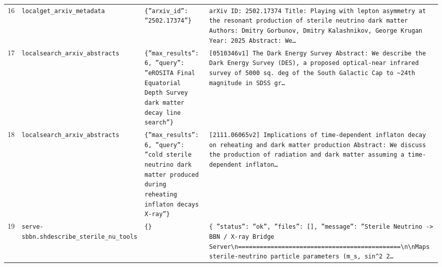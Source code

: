\documentclass[11pt,a4paper]{article}
\begin{document}
\begin{longtable}{@{}p{}p{}p{}p{}@{}}
16 & \texttt{local}\newline\texttt{get\_\allowbreak{}arxiv\_\allowbreak{}metadata} & \texttt{\{''arxiv\_\allowbreak{}id'':\allowbreak{} ''2502.17374''\}\allowbreak{}} & \texttt{arXiv ID:\allowbreak{} 2502.17374 Title:\allowbreak{} Playing with lepton asymmetry at the resonant production of sterile neutrino dark matter Authors:\allowbreak{} Dmitry Gorbunov,\allowbreak{} Dmitry Kalashnikov,\allowbreak{} George Krugan Year:\allowbreak{} 2025 Abstract:\allowbreak{} We\ldots{}\allowbreak{}} \\
17 & \texttt{local}\newline\texttt{search\_\allowbreak{}arxiv\_\allowbreak{}abstracts} & \texttt{\{''max\_\allowbreak{}results'':\allowbreak{} 6,\allowbreak{} ''query'':\allowbreak{} ''eROSITA Final Equatorial Depth Survey dark matter decay line search''\}\allowbreak{}} & \texttt{[0510346v1]\allowbreak{} The Dark Energy Survey Abstract:\allowbreak{}   We describe the Dark Energy Survey (DES)\allowbreak{},\allowbreak{} a proposed optical-near infrared survey of 5000 sq. deg of the South Galactic Cap to \textasciitilde{}\allowbreak{}24th magnitude in SDSS gr\ldots{}\allowbreak{}} \\
18 & \texttt{local}\newline\texttt{search\_\allowbreak{}arxiv\_\allowbreak{}abstracts} & \texttt{\{''max\_\allowbreak{}results'':\allowbreak{} 6,\allowbreak{} ''query'':\allowbreak{} ''cold sterile neutrino dark matter produced during reheating inflaton decays X-ray''\}\allowbreak{}} & \texttt{[2111.06065v2]\allowbreak{} Implications of time-dependent inflaton decay on reheating and dark matter production Abstract:\allowbreak{} We discuss the production of radiation and dark matter assuming a time-dependent inflaton\ldots{}\allowbreak{}} \\
19 & \texttt{serve-sbbn.sh}\newline\texttt{describe\_\allowbreak{}sterile\_\allowbreak{}nu\_\allowbreak{}tools} & \texttt{\{\}\allowbreak{}} & \texttt{\{   ''status'':\allowbreak{} ''ok'',\allowbreak{}   ''files'':\allowbreak{} []\allowbreak{},\allowbreak{}   ''message'':\allowbreak{} ''Sterile Neutrino -\textgreater{}\allowbreak{} BBN /\allowbreak{} X-ray Bridge Server\textbackslash{}\allowbreak{}n=\allowbreak{}=\allowbreak{}=\allowbreak{}=\allowbreak{}=\allowbreak{}=\allowbreak{}=\allowbreak{}=\allowbreak{}=\allowbreak{}=\allowbreak{}=\allowbreak{}=\allowbreak{}=\allowbreak{}=\allowbreak{}=\allowbreak{}=\allowbreak{}=\allowbreak{}=\allowbreak{}=\allowbreak{}=\allowbreak{}=\allowbreak{}=\allowbreak{}=\allowbreak{}=\allowbreak{}=\allowbreak{}=\allowbreak{}=\allowbreak{}=\allowbreak{}=\allowbreak{}=\allowbreak{}=\allowbreak{}=\allowbreak{}=\allowbreak{}=\allowbreak{}=\allowbreak{}=\allowbreak{}=\allowbreak{}=\allowbreak{}=\allowbreak{}=\allowbreak{}=\allowbreak{}=\allowbreak{}=\allowbreak{}=\allowbreak{}=\allowbreak{}\textbackslash{}\allowbreak{}n\textbackslash{}\allowbreak{}nMaps sterile-neutrino particle parameters (m\_\allowbreak{}s,\allowbreak{} sin\textasciicircum{}\allowbreak{}2 2\ldots{}\allowbreak{}} \\

\end{longtable}
\end{document}

